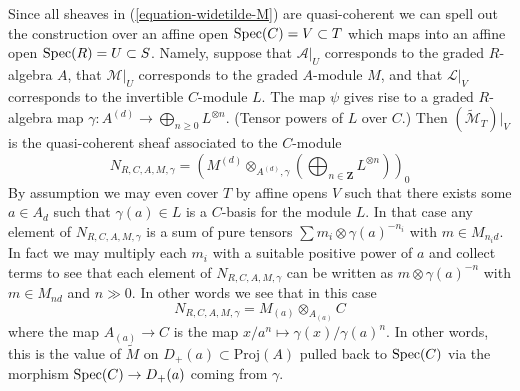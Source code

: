 \medskip\noindent
Since all sheaves in (\ref{equation-widetilde-M}) are quasi-coherent
we can spell out the construction
over an affine open $\mathop{\rm Spec}(C) = V \subset T$
which maps into an affine open $\mathop{\rm Spec}(R) = U \subset S$.
Namely, suppose that $\mathcal{A}|_U$ corresponds
to the graded $R$-algebra $A$, that $\mathcal{M}|_U$ corresponds to the
graded $A$-module $M$, and that $\mathcal{L}|_V$ corresponds to the
invertible $C$-module $L$. The map $\psi$ gives
rise to a graded $R$-algebra map
$\gamma : A^{(d)} \to \bigoplus_{n \geq 0} L^{\otimes n}$.
(Tensor powers of $L$ over $C$.)
Then $(\widetilde{\mathcal{M}}_T)|_V$
is the quasi-coherent sheaf associated to the $C$-module
$$
N_{R, C, A, M, \gamma} =
\left(
M^{(d)} \otimes_{A^{(d)}, \gamma}
\left(\bigoplus\nolimits_{n \in \mathbf{Z}} L^{\otimes n}\right)
\right)_0
$$
By assumption we may even cover $T$ by affine opens
$V$ such that there exists some $a \in A_d$ such that
$\gamma(a) \in L$ is a $C$-basis for the module $L$.
In that case any element of $N_{R, C, A, M, \gamma}$ is a sum
of pure tensors $\sum m_i \otimes \gamma(a)^{-n_i}$ with $m \in M_{n_id}$.
In fact we may multiply each $m_i$ with a suitable positive power
of $a$ and collect terms to see that each element of $N_{R, C, A, M, \gamma}$
can be written as $m \otimes \gamma(a)^{-n}$ with $m \in M_{nd}$ and
$n \gg 0$. In other words we see that in this case
$$
N_{R, C, A, M, \gamma} = M_{(a)}\otimes_{A_{(a)}} C
$$
where the map $A_{(a)} \to C$ is the map
$x/a^n \mapsto \gamma(x)/\gamma(a)^n$. In other words, this is
the value of $\widetilde{M}$ on $D_{+}(a) \subset \text{Proj}(A)$
pulled back to $\mathop{\rm Spec}(C)$ via the morphism
$\mathop{\rm Spec}(C) \to D_{+}(a)$ coming from $\gamma$.

